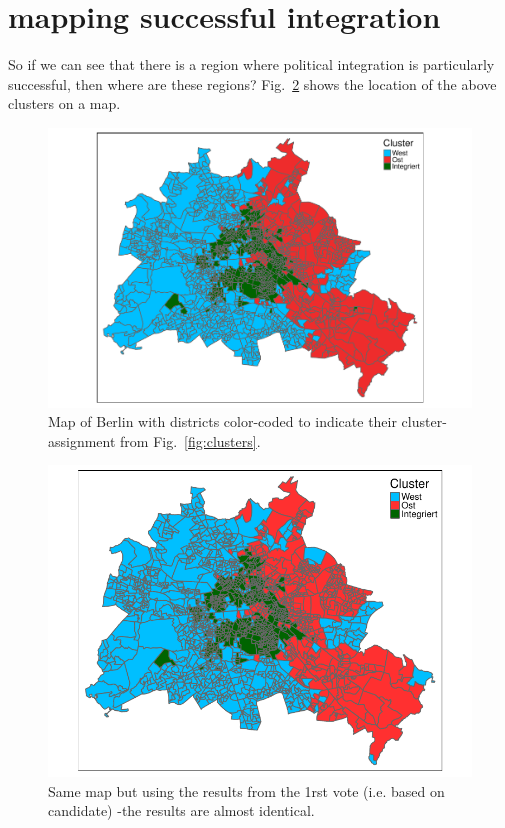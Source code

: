 \documentclass[amsmath,amssymb,nofootinbib,12pt,preprint]{revtex4}
\begin{document}
\clearpage
\section{mapping successful integration}

So if we can see that there is a region where political integration is particularly successful, then where are these regions? Fig.~\ref{fig:map} shows the location of the above clusters on a map.
\begin{figure}[h]%
\includegraphics[scale=.85]{../figures/map_vote2_greenCC}%
\caption{ Map of Berlin with districts color-coded to indicate their cluster-assignment from Fig.~\ref{fig:clusters}. } 
\label{fig:map_vote2}%
\end{figure}

\begin{figure}[h]%
\includegraphics[scale=.85]{../figures/map_othercolorscheme}%
\caption{ Same map but using the results from the 1rst vote (i.e. based on candidate) -the results are almost identical.}
\label{fig:map}%
\end{figure}
\end{document}
